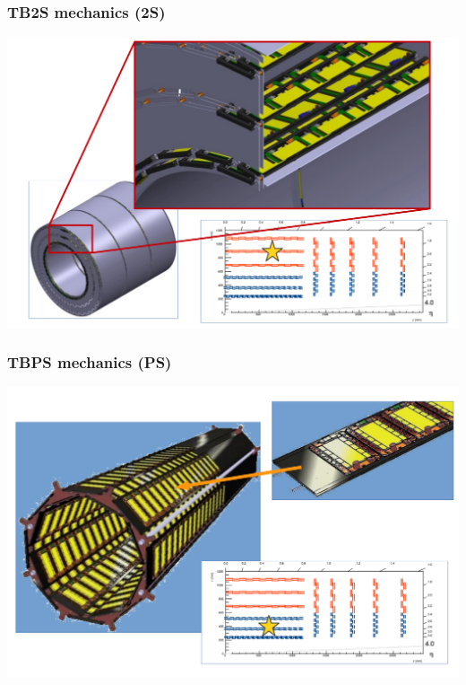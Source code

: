\documentclass[pdftex, 11pt]{beamer}
\begin{document}
\begin{frame}
  \frametitle{TB2S mechanics (2S)}
  \begin{center}
    \includegraphics[width=\textwidth]{img/mechanics2.pdf}
  \end{center}
\end{frame}

\begin{frame}
  \frametitle{TBPS mechanics (PS)}
  \begin{center}
    \includegraphics[width=\textwidth]{img/mechanics3.pdf}
  \end{center}
\end{frame}
\end{document}
